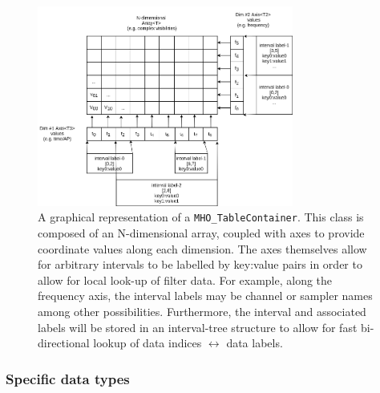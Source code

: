 \begin{figure}[h!]
  \begin{center}
  \captionsetup{width=0.7\linewidth}
  \includegraphics[width=0.75\textwidth]{fig/data-container-baseline.png}
    \caption{A graphical representation of a \texttt{MHO\_TableContainer}. This class is composed of an N-dimensional array, coupled with axes to provide coordinate values along each dimension. The axes themselves allow for arbitrary intervals to be labelled by key:value pairs in order to allow for local look-up of filter data. For example, along the frequency axis, the interval labels may be channel or sampler names among other possibilities. Furthermore, the interval and associated labels will be stored in an interval-tree structure to allow for fast bi-directional lookup of data indices $\leftrightarrow$ data labels.}
    \label{fig:table-container}
\end{center}
\end{figure}

\subsubsection{Specific data types}

